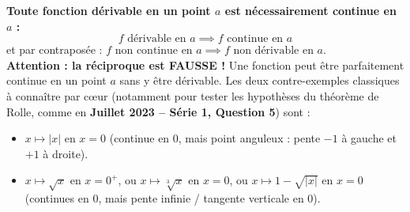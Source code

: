 \begin{attention}
\textbf{Toute fonction dérivable en un point $a$ est nécessairement continue en $a$ :}
\[
    \boxed{f \text{ dérivable en } a \implies f \text{ continue en } a}
\]
et par contraposée : $\boxed{f \text{ non continue en } a \implies f \text{ non dérivable en } a}$.\\
\textbf{Attention : la réciproque est FAUSSE !} Une fonction peut être parfaitement continue en un point $a$ sans y être dérivable. Les deux contre-exemples classiques à connaître par cœur (notamment pour tester les hypothèses du théorème de Rolle, comme en \textbf{Juillet 2023 -- Série 1, Question 5}) sont :
\begin{itemize}
    \item $x \mapsto |x|$ en $x = 0$ (continue en $0$, mais point anguleux : pente $-1$ à gauche et $+1$ à droite).
    \item $x \mapsto \sqrt{x}$ en $x = 0^+$, ou $x \mapsto \sqrt[3]{x}$ en $x = 0$, ou $x \mapsto 1 - \sqrt{|x|}$ en $x = 0$ (continues en $0$, mais pente infinie / tangente verticale en $0$).
\end{itemize}
\end{attention}


